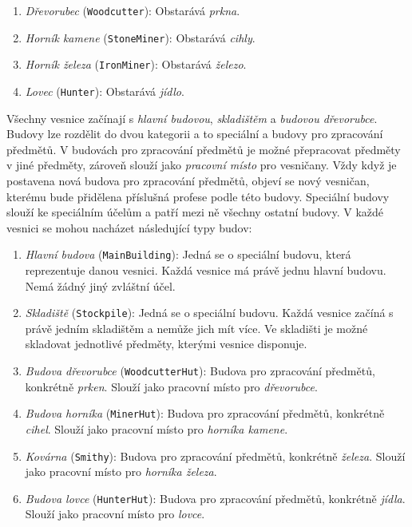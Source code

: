 \begin{enumerate}
    \item \textit{Dřevorubec} (\verb|Woodcutter|): Obstarává \textit{prkna}.
    \item \textit{Horník kamene} (\verb|StoneMiner|): Obstarává \textit{cihly}.
    \item \textit{Horník železa} (\verb|IronMiner|): Obstarává \textit{železo}.
    \item \textit{Lovec} (\verb|Hunter|): Obstarává \textit{jídlo}.
\end{enumerate}

Všechny vesnice začínají s \textit{hlavní budovou}, \textit{skladištěm} a \textit{budovou dřevorubce}. Budovy lze rozdělit do dvou kategorii a to speciální a budovy pro zpracování předmětů. V budovách pro zpracování předmětů je možné přepracovat předměty v jiné předměty, zároveň slouží jako \textit{pracovní místo} pro vesničany. Vždy když je postavena nová budova pro zpracování předmětů, objeví se nový vesničan, kterému bude přidělena příslušná profese podle této budovy. Speciální budovy slouží ke speciálním účelům a patří mezi ně všechny ostatní budovy. V každé vesnici se mohou nacházet následující typy budov:

\begin{enumerate}
    \item \textit{Hlavní budova} (\verb|MainBuilding|): Jedná se o speciální budovu, která reprezentuje danou vesnici. Každá vesnice má právě jednu hlavní budovu. Nemá žádný jiný zvláštní účel.
    \item \textit{Skladiště} (\verb|Stockpile|): Jedná se o speciální budovu. Každá vesnice začíná s právě jedním skladištěm a nemůže jich mít více. Ve skladišti je možné skladovat jednotlivé předměty, kterými vesnice disponuje.
    \item \textit{Budova dřevorubce} (\verb|WoodcutterHut|): Budova pro zpracování předmětů, konkrétně \textit{prken}. Slouží jako pracovní místo pro \textit{dřevorubce}.
    \item \textit{Budova horníka} (\verb|MinerHut|): Budova pro zpracování předmětů, konkrétně \textit{cihel}. Slouží jako pracovní místo pro \textit{horníka kamene}.
    \item \textit{Kovárna} (\verb|Smithy|): Budova pro zpracování předmětů, konkrétně \textit{železa}. Slouží jako pracovní místo pro \textit{horníka železa}.
    \item \textit{Budova lovce} (\verb|HunterHut|): Budova pro zpracování předmětů, konkrétně \textit{jídla}. Slouží jako pracovní místo pro \textit{lovce}.
\end{enumerate}
